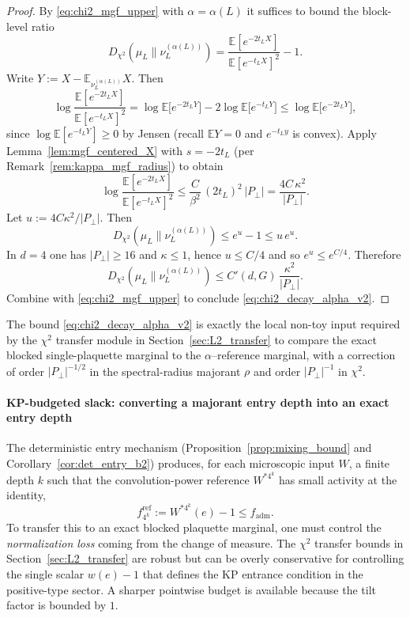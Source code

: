 \begin{proof}
By \eqref{eq:chi2_mgf_upper} with $\alpha=\alpha(L)$ it suffices to bound the block-level ratio
\[
D_{\chi^2}(\mu_L\|\nu_L^{(\alpha(L))})
=\frac{\mathbb E[e^{-2t_L X}]}{\mathbb E[e^{-t_L X}]^2}-1.
\]
Write $Y:=X-\mathbb E_{\nu_L^{(\alpha(L))}}X$.
Then
\[
\log\frac{\mathbb E[e^{-2t_L X}]}{\mathbb E[e^{-t_L X}]^2}
=
\log \mathbb E\big[e^{-2t_L Y}\big] - 2\log \mathbb E\big[e^{-t_L Y}\big]
\le \log \mathbb E\big[e^{-2t_L Y}\big],
\]
since $\log \mathbb E[e^{-t_L Y}]\ge 0$ by Jensen (recall $\mathbb E Y=0$ and $e^{-t_L y}$ is convex).
Apply Lemma~\ref{lem:mgf_centered_X} with $s=-2t_L$ (per Remark~\ref{rem:kappa_mgf_radius}) to obtain
\[
\log\frac{\mathbb E[e^{-2t_L X}]}{\mathbb E[e^{-t_L X}]^2}
\le \frac{C}{\beta^2}\,(2t_L)^2\,|P_\perp|
= \frac{4C\,\kappa^2}{|P_\perp|}.
\]
Let $u:=4C\kappa^2/|P_\perp|$.
Then
\[
D_{\chi^2}(\mu_L\|\nu_L^{(\alpha(L))})
\le e^{u}-1 \le u\,e^{u}.
\]
In $d=4$ one has $|P_\perp|\ge 16$ and $\kappa\le 1$, hence $u\le C/4$ and so $e^{u}\le e^{C/4}$.
Therefore
\[
D_{\chi^2}(\mu_L\|\nu_L^{(\alpha(L))})
\le C'(d,G)\,\frac{\kappa^2}{|P_\perp|}.
\]
Combine with \eqref{eq:chi2_mgf_upper} to conclude \eqref{eq:chi2_decay_alpha_v2}.

\end{proof}

\medskip
The bound \eqref{eq:chi2_decay_alpha_v2} is exactly the local non-toy input required by the $\chi^2$ transfer module in
Section~\ref{sec:L2_transfer} to compare the exact blocked single-plaquette marginal to the $\alpha$--reference marginal, with a correction of
order $|P_\perp|^{-1/2}$ in the spectral-radius majorant $\rho$ and order $|P_\perp|^{-1}$ in $\chi^2$.



\paragraph{KP-budgeted slack: converting a majorant entry depth into an exact entry depth}

The deterministic entry mechanism (Proposition~\ref{prop:mixing_bound} and Corollary~\ref{cor:det_entry_b2})
produces, for each microscopic input $W$, a finite depth $k$ such that the convolution-power reference
$W^{*4^k}$ has small activity at the identity,
\[
f^{\mathrm{ref}}_{4^k}:=W^{*4^k}(e)-1 \le f_{\mathrm{adm}}.
\]
To transfer this to an exact blocked plaquette marginal, one must control the \emph{normalization loss}
coming from the change of measure. The $\chi^2$ transfer bounds in
Section~\ref{sec:L2_transfer} are robust but can be overly conservative for controlling the single scalar
$w(e)-1$ that defines the KP entrance condition in the positive-type sector.
A sharper pointwise budget is available because the tilt factor is bounded by $1$.

